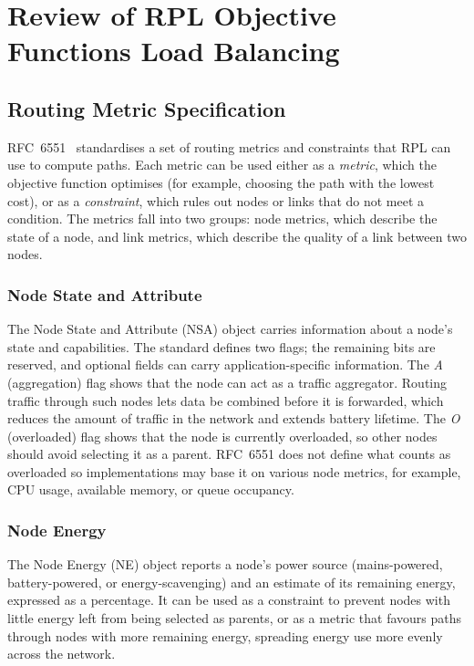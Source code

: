 \section{Review of RPL Objective Functions Load Balancing}
\label{sec:related-work}
\subsection{Routing Metric Specification}
RFC~6551~\cite{rfc6551} standardises a set of routing metrics and
constraints that RPL can use to compute paths. Each metric can be
used either as a \emph{metric}, which the objective function
optimises (for example, choosing the path with the lowest cost), or
as a \emph{constraint}, which rules out nodes or links that do not
meet a condition. The metrics fall into two groups: node metrics,
which describe the state of a node, and link metrics, which describe
the quality of a link between two nodes.


\subsubsection{Node State and Attribute}
The Node State and Attribute (NSA) object carries information about a
node's state and capabilities. The standard defines two flags; the
remaining bits are reserved, and optional fields can carry
application-specific information. The \emph{A} (aggregation) flag
shows that the node can act as a traffic aggregator. Routing traffic
through such nodes lets data be combined before it is forwarded,
which reduces the amount of traffic in the network and extends
battery lifetime. The \emph{O} (overloaded) flag shows that the node
is currently overloaded, so other nodes should avoid selecting it as
a parent. RFC~6551 does not define what counts as overloaded so
implementations may base it on various node metrics, for example, CPU
usage, available memory, or queue occupancy.

\subsubsection{Node Energy}
The Node Energy (NE) object reports a node's power source
(mains-powered, battery-powered, or energy-scavenging) and an
estimate of its remaining energy, expressed as a percentage. It can
be used as a constraint to prevent nodes with little energy left from
being selected as parents, or as a metric that favours paths through
nodes with more remaining energy, spreading energy use more evenly
across the network.

